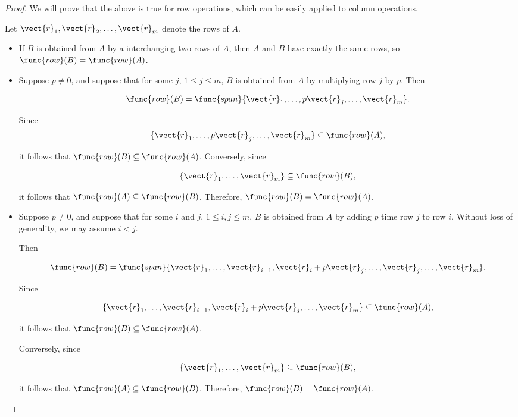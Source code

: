 \begin{proof}
We will prove that the above is true for row operations, which can be easily applied to column operations. 

Let $\vect{r}_1, \vect{r}_2, \ldots, \vect{r}_m$ denote the rows of $A$.

\begin{itemize}
\item If $B$ is obtained from $A$ by a interchanging two rows of $A$, then
$A$ and $B$ have exactly the same rows, so $\func{row}(B)=\func{row}(A)$.

\item
Suppose $p\neq 0$, and suppose that for some $j$, $1\leq j\leq m$,
$B$ is obtained from $A$ by multiplying row $j$ by $p$.
Then 

\[ \func{row}(B)=\func{span}\{ \vect{r}_1, \ldots, 
p\vect{r}_{j}, \ldots, \vect{r}_m\}.  \]

Since
\[ \{ \vect{r}_1, \ldots, 
p\vect{r}_{j}, \ldots, \vect{r}_m\} \subseteq\func{row}(A),\]

it follows that $\func{row}(B)\subseteq\func{row}(A)$.
Conversely, since

\[ \{ \vect{r}_1, \ldots, \vect{r}_m\}\subseteq\func{row}(B),\]

it follows that $\func{row}(A)\subseteq\func{row}(B)$.
Therefore, $\func{row}(B)=\func{row}(A)$.

\item
Suppose $p\neq 0$, and suppose that for some $i$ and $j$,
$1\leq i,j\leq m$,
$B$ is obtained from $A$ by adding $p$ time row $j$ to row $i$.
Without loss of generality, we may assume $i<j$.

Then 

\[ \func{row}(B)=\func{span}\{ \vect{r}_1, \ldots, \vect{r}_{i-1},
\vect{r}_i+p\vect{r}_j, \ldots,\vect{r}_j,\ldots, \vect{r}_m\}.  \]

Since

\[ \{ \vect{r}_1, \ldots, \vect{r}_{i-1}, 
\vect{r}_i+p\vect{r}_{j}, \ldots, \vect{r}_m\} \subseteq\func{row}(A),\]

it follows that $\func{row}(B)\subseteq\func{row}(A)$.

Conversely, since

\[ \{ \vect{r}_1, \ldots, \vect{r}_m\}\subseteq\func{row}(B),\]

it follows that $\func{row}(A)\subseteq\func{row}(B)$.
Therefore, $\func{row}(B)=\func{row}(A)$.
\end{itemize}
\end{proof}


